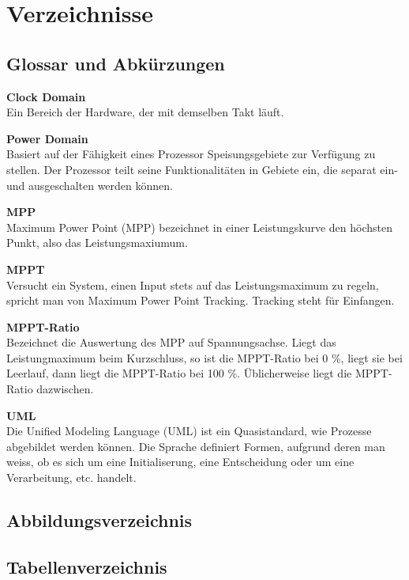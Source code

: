\chapter{Verzeichnisse}




\renewcommand{\bibsection}{\section{\refname}}  %
\makeatletter
\makeatother






\section{Glossar und Abkürzungen}\label{glossar}

\textbf{Clock Domain}\\
Ein Bereich der Hardware, der mit demselben Takt läuft.

\textbf{Power Domain}\\
Basiert auf der Fähigkeit eines Prozessor Speisungsgebiete zur Verfügung zu stellen. Der Prozessor teilt seine Funktionalitäten in Gebiete ein, die separat ein- und ausgeschalten werden können.

\textbf{MPP}\\
Maximum Power Point (MPP) bezeichnet in einer Leistungskurve den höchsten Punkt, also das Leistungsmaxiumum.

\textbf{MPPT}\\
Versucht ein System, einen Input stets auf das Leistungsmaximum zu regeln, spricht man von Maximum Power Point Tracking. Tracking steht für Einfangen.

\textbf{MPPT-Ratio}\\
Bezeichnet die Auswertung des MPP auf Spannungsachse. Liegt das Leistungmaximum beim Kurzschluss, so ist die MPPT-Ratio bei 0 \%, liegt sie bei Leerlauf, dann liegt die MPPT-Ratio bei 100 \%. Üblicherweise liegt die MPPT-Ratio dazwischen.

\textbf{UML}\\
Die Unified Modeling Language (UML) ist ein Quasistandard, wie Prozesse abgebildet werden können. Die Sprache definiert Formen, aufgrund deren man weiss, ob es sich um eine Initialiserung, eine Entscheidung oder um eine Verarbeitung, etc. handelt.


\section{Abbildungsverzeichnis}


\section{Tabellenverzeichnis}

